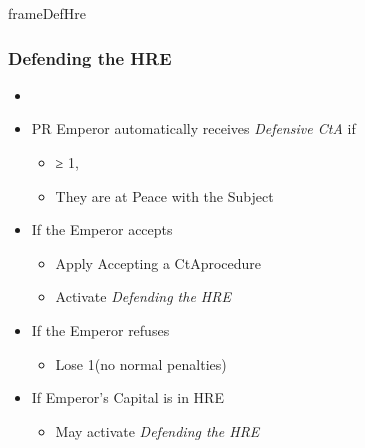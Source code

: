 \documentclass[10pt]{article}
\newlength{\fhDefHre} \setlength\fhDefHre{17\baselineskip}
\begin{document}
\begin{dynamiccontents*}{frameDefHre}\begin{eubox}{\fhDefHre}
	\subsubsection*{Defending the HRE }
	\begin{itemize}
			\item {}
			\item PR Emperor automatically receives \emph{Defensive CtA} if
		\begin{itemize}
			\item \authority ≥ 1, 
			\item They are at Peace with the Subject
		\end{itemize}
		\item If the Emperor accepts
		\begin{itemize}
			\item Apply \dprime Accepting a CtA\dprime procedure
			\item {}Activate \emph{Defending the HRE}
		\end{itemize}
		\item If the Emperor refuses
		\begin{itemize}
			\item Lose 1\authority (no normal penalties)
		\end{itemize}
	\end{itemize}
	\begin{itemize}
		\item If Emperor's Capital is in HRE
		\begin{itemize}
			\item {}May activate \emph{Defending the HRE}
			\begin{itemize}
			\end{itemize}
		\end{itemize}
	\end{itemize}
\end{eubox}\end{dynamiccontents*}
\end{document}
